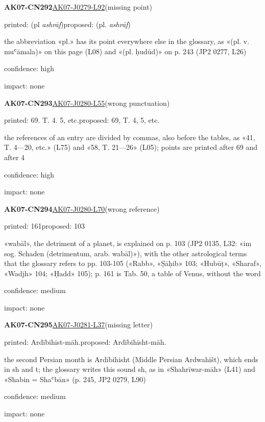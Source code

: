 \documentclass[11pt]{article}
\begin{document}
\noindent\textbf{AK07-CN292}\enspace\hyperlink{AK07-J0279-L92}{AK07-J0279-L92}\enspace(missing point)\par\noindent printed: (pl \textit{ashrāf})\enspace proposed: (pl. \textit{ashrāf})\par\noindent the abbreviation «pl.» has its point everywhere else in the glossary, as «(pl. v. muʿāmala)» on this page (L08) and «(pl. ḥudūd)» on p. 243 (JP2 0277, L26)\par\noindent confidence: high\par\noindent impact: none\par\medskip
\noindent\textbf{AK07-CN293}\enspace\hyperlink{AK07-J0280-L55}{AK07-J0280-L55}\enspace(wrong punctuation)\par\noindent printed: 69. T. 4. 5, etc.\enspace proposed: 69, T. 4, 5, etc.\par\noindent the references of an entry are divided by commas, also before the tables, as «41, T. 4—20, etc.» (L75) and «58, T. 21—26» (L05); points are printed after 69 and after 4\par\noindent confidence: high\par\noindent impact: none\par\medskip
\noindent\textbf{AK07-CN294}\enspace\hyperlink{AK07-J0280-L70}{AK07-J0280-L70}\enspace(wrong reference)\par\noindent printed: 161\enspace proposed: 103\par\noindent «wabāl», the detriment of a planet, is explained on p. 103 (JP2 0135, L32: «im sog. Schaden (detrimentum, arab. wabāl)»), with the other astrological terms that the glossary refers to pp. 103-105 («Rabb», «Ṣāḥib» 103; «Hubūṭ», «Sharaf», «Wadjh» 104; «Ḥadd» 105); p. 161 is Tab. 50, a table of Venus, without the word\par\noindent confidence: medium\par\noindent impact: none\par\medskip
\noindent\textbf{AK07-CN295}\enspace\hyperlink{AK07-J0281-L37}{AK07-J0281-L37}\enspace(missing letter)\par\noindent printed: Ardībihist-māh.\enspace proposed: Ardībihisht-māh.\par\noindent the second Persian month is Ardībihisht (Middle Persian Ardwahišt), which ends in sh and t; the glossary writes this sound sh, as in «Shahrīwar-māh» (L41) and «Shabin = Shaʿbān» (p. 245, JP2 0279, L90)\par\noindent confidence: medium\par\noindent impact: none\par\medskip
\end{document}
